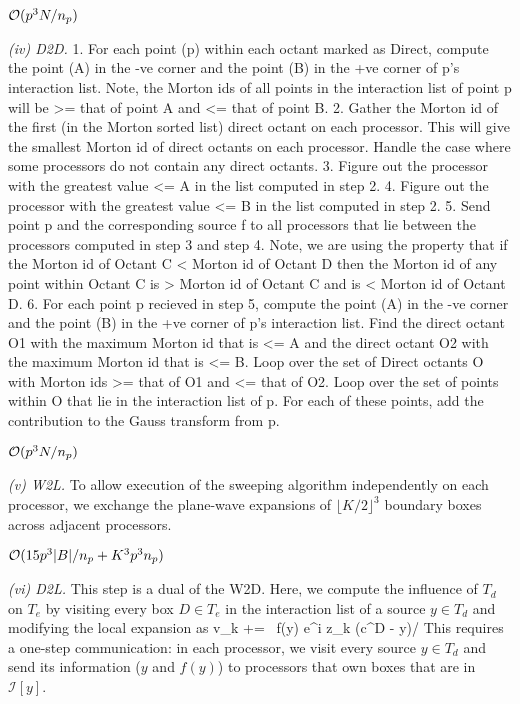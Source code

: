 \hfill $\mathcal{O}(p^3 N / n_p)$

{\em (iv) D2D.}
1. For each point (p) within each octant marked as Direct, compute the
point (A) in the -ve corner and the point (B) in the +ve corner of p's
interaction list. Note, the Morton ids of all points in the interaction
list of point p will be >= that of point A and <= that of point B.
2. Gather the Morton id of the first (in the Morton sorted list) direct
octant on each processor. This will give the smallest Morton id of
direct octants on each processor. Handle the case where some processors
do not contain any direct octants.
3. Figure out the processor with the greatest value <= A in the list
computed in step 2.
4. Figure out the processor with the greatest value <= B in the list
computed in step 2.
5. Send point p and the corresponding source f to all processors that
lie between the processors computed in step 3 and step 4. Note, we are 
using the property that if the Morton id of Octant C < Morton id of 
Octant D then the Morton id of any point within Octant C is >  Morton
id of Octant C and is < Morton id of Octant D.
6. For each point p recieved in step 5, compute the
point (A) in the -ve corner and the point (B) in the +ve corner of p's
interaction list. Find the direct octant O1 with the maximum Morton id that
is <= A and the direct octant O2 with the maximum Morton id that is <=
B. Loop over the set of Direct octants O with Morton ids >= that of O1
and <= that of O2. Loop over the set of points within O that lie in the
interaction list of p. For each of these points, add the contribution to
the Gauss transform from p.

\hfill $\mathcal{O}(p^3 N/n_p)$

{\em (v) W2L.} To allow execution of the sweeping algorithm independently on each processor, we exchange the plane-wave expansions of $\lfloor K/2 \rfloor ^3$ boundary boxes across adjacent processors. 

\hfill $\mathcal{O}(15 p^3 |B|/n_p + K^3 p^3 n_p)$

{\em (vi) D2L.} This step is a dual of the W2D. Here, we compute the influence of $T_d$ on $T_e$ by visiting every box $D \in T_e$ in the interaction list of a source $y \in T_d$ and modifying the local expansion as 
%
\beq v_k += \, f(y) e^{i z_k \cdot (c^D - y)/\sqrt{\delta}} \eeq
%
This requires a one-step communication: in each processor, we visit every source $y \in T_d$ 
and send its information ($y$ and $f(y)$) to processors that own boxes that are in $\mathcal{I}[y]$.

